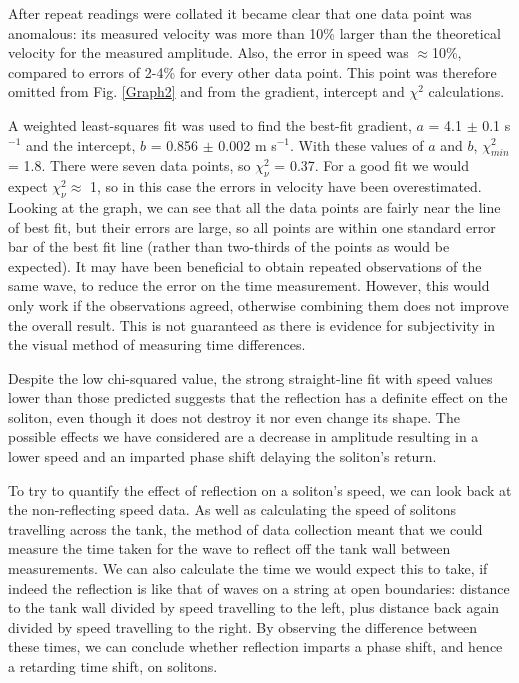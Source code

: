 \documentclass[10pt, twocolumn]{revtex4}    %
\begin{document}
After repeat readings were collated it became clear that one data point was anomalous: its measured velocity was more than 10\% larger than the theoretical velocity for the measured amplitude. Also, the error in speed was $\approx$10\%, compared to errors of 2-4\% for every other data point. This point was therefore omitted from Fig. \ref{Graph2} and from the gradient, intercept and $\chi^2$ calculations. 

A weighted least-squares fit was used to find the best-fit gradient, $a$ = 4.1 $\pm$ 0.1 s$^{-1}$ and the intercept, $b$ = 0.856 $\pm$ 0.002 m s$^{-1}$. With these values of $a$ and $b$, $\chi^2_{min}$ = 1.8. There were seven data points, so $\chi_\nu^2$ = 0.37. For a good fit we would expect  $\chi_\nu^2 \approx$ 1, so in this case the errors in velocity have been overestimated. Looking at the graph, we can see that all the data points are fairly near the line of best fit, but their errors are large, so all points are within one standard error bar of the best fit line (rather than two-thirds of the points as would be expected). It may have been beneficial to obtain repeated observations of the same wave, to reduce the error on the time measurement. However, this would only work if the observations agreed, otherwise combining them does not improve the overall result. This is not guaranteed as there is evidence for subjectivity in the visual method of measuring time differences.

Despite the low chi-squared value, the strong straight-line fit with speed values lower than those predicted suggests that the reflection has a definite effect on the soliton, even though it does not destroy it nor even change its shape. The possible effects we have considered are a decrease in amplitude resulting in a lower speed and an imparted phase shift delaying the soliton’s return. 

To try to quantify the effect of reflection on a soliton's speed, we can look back at the non-reflecting speed data. As well as calculating the speed of solitons travelling across the tank, the method of data collection meant that we could measure the time taken for the wave to reflect off the tank wall between measurements. We can also calculate the time we would expect this to take, if indeed the reflection is like that of waves on a string at open boundaries: distance to the tank wall divided by speed travelling to the left, plus distance back again divided by speed travelling to the right. By observing the difference between these times, we can conclude whether reflection imparts a phase shift, and hence a retarding time shift, on solitons. 
\end{document}
